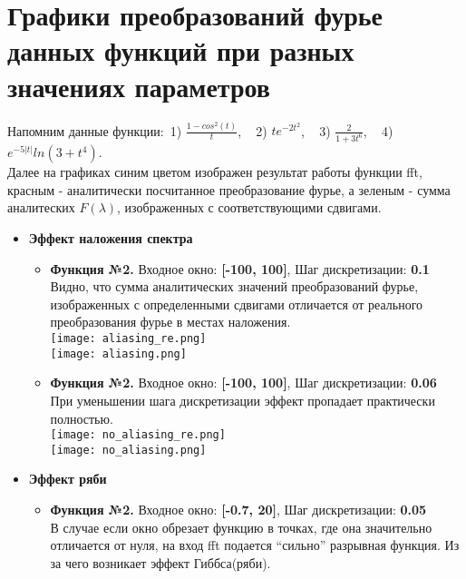\documentclass[11pt]{article}
\begin{document}
\section{Графики преобразований фурье данных функций при разных значениях параметров}
Напомним данные функции:~1) \( \frac{1 - cos^2(t)}{t} \), ~ 2) \( te^{-2t^2}\), ~ 3) \( \frac{2}{1 + 3t^6} \), ~ 4) \( e^{-5|t|}ln(3+t^4) \). \bigskip \\
Далее на графиках синим цветом изображен результат работы функции fft, красным - аналитически посчитанное преобразование фурье, а зеленым - сумма аналитеских \(F(\lambda)\), изображенных с соответствующими сдвигами. \bigskip \\
\newpage
\begin{itemize}
	\item \textbf{Эффект наложения спектра} \\
	\begin{itemize}
		\item \textbf{Функция №2.} Входное окно: \textbf{[-100, 100]}, Шаг дискретизации: \textbf{0.1} \medskip \\
			Видно, что сумма аналитических значений преобразований фурье, изображенных с определенными сдвигами отличается от реального преобразования фурье в местах наложения.\bigskip \\
			\texttt{[image: aliasing\_re.png]}\\
			\texttt{[image: aliasing.png]}\\
		\item \textbf{Функция №2.} Входное окно: \textbf{[-100, 100]}, Шаг дискретизации: \textbf{0.06} \medskip \\
			При уменьшении шага дискретизации эффект пропадает практически полностью. \bigskip \\
			\texttt{[image: no\_aliasing\_re.png]}\\
			\texttt{[image: no\_aliasing.png]}\\
	\end{itemize} 
	\newpage
	\item \textbf{Эффект ряби} \\
	\begin{itemize}
		\item \textbf{Функция №2.} Входное окно: \textbf{[-0.7, 20]}, Шаг дискретизации: \textbf{0.05} \medskip \\
			В случае если окно обрезает функцию в точках, где она значительно отличается от нуля, на вход fft подается ``сильно'' разрывная функция. Из за чего возникает эффект Гиббса(ряби).\bigskip \\

\end{itemize}
\end{itemize}
\end{document}
